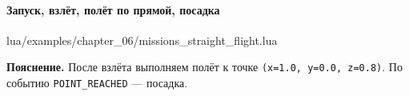 \paragraph{Запуск, взлёт, полёт по прямой, посадка}
\begin{codefile}{lua/examples/chapter_06/missions_straight_flight.lua}
\end{codefile}
\textbf{Пояснение.} После взлёта выполняем полёт к точке \texttt{(x=1.0, y=0.0, z=0.8)}. По событию \texttt{POINT\_REACHED} — посадка.

